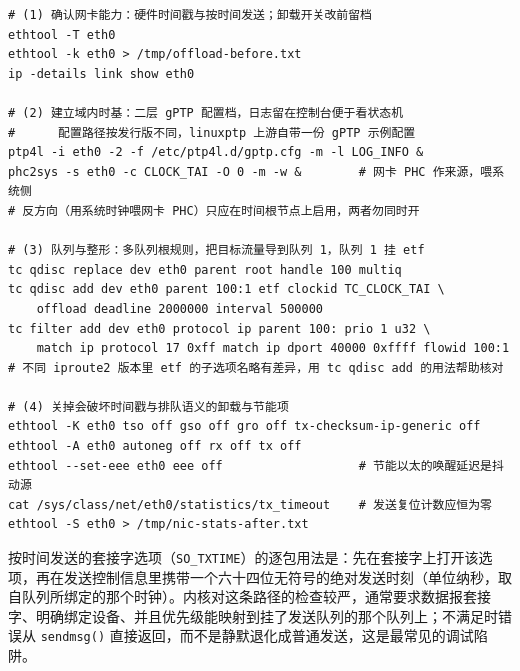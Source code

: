 \documentclass[12pt,a4paper,fontset=fandol]{ctexbook}
\newcommand{\Fn}[1]{\texttt{#1()}}
\newcommand{\Tp}[1]{\texttt{#1}}
\begin{document}
\begin{lstlisting}[style=shellstyle,caption={Shell：ptp4l 与 phc2sys 建立时基，并用 tc 挂载按时刻发送的队列},label={lst:ch12-ptp-etf}]
# (1) 确认网卡能力：硬件时间戳与按时间发送；卸载开关改前留档
ethtool -T eth0
ethtool -k eth0 > /tmp/offload-before.txt
ip -details link show eth0

# (2) 建立域内时基：二层 gPTP 配置档，日志留在控制台便于看状态机
#      配置路径按发行版不同，linuxptp 上游自带一份 gPTP 示例配置
ptp4l -i eth0 -2 -f /etc/ptp4l.d/gptp.cfg -m -l LOG_INFO &
phc2sys -s eth0 -c CLOCK_TAI -O 0 -m -w &        # 网卡 PHC 作来源，喂系统侧
# 反方向（用系统时钟喂网卡 PHC）只应在时间根节点上启用，两者勿同时开

# (3) 队列与整形：多队列根规则，把目标流量导到队列 1，队列 1 挂 etf
tc qdisc replace dev eth0 parent root handle 100 multiq
tc qdisc add dev eth0 parent 100:1 etf clockid TC_CLOCK_TAI \
    offload deadline 2000000 interval 500000
tc filter add dev eth0 protocol ip parent 100: prio 1 u32 \
    match ip protocol 17 0xff match ip dport 40000 0xffff flowid 100:1
# 不同 iproute2 版本里 etf 的子选项名略有差异，用 tc qdisc add 的用法帮助核对

# (4) 关掉会破坏时间戳与排队语义的卸载与节能项
ethtool -K eth0 tso off gso off gro off tx-checksum-ip-generic off
ethtool -A eth0 autoneg off rx off tx off
ethtool --set-eee eth0 eee off                   # 节能以太的唤醒延迟是抖动源
cat /sys/class/net/eth0/statistics/tx_timeout    # 发送复位计数应恒为零
ethtool -S eth0 > /tmp/nic-stats-after.txt
\end{lstlisting}

按时间发送的套接字选项（\Tp{SO\_TXTIME}）的逐包用法是：先在套接字上打开该选项，再在发送控制信息里携带一个六十四位无符号的绝对发送时刻（单位纳秒，取自队列所绑定的那个时钟）。内核对这条路径的检查较严，通常要求数据报套接字、明确绑定设备、并且优先级能映射到挂了发送队列的那个队列上；不满足时错误从 \Fn{sendmsg} 直接返回，而不是静默退化成普通发送，这是最常见的调试陷阱。
\end{document}

